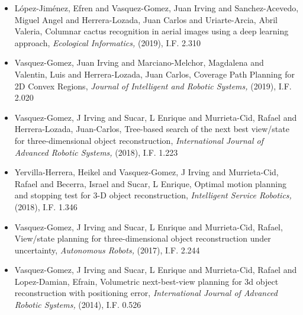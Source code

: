 \begin{itemize} 
\item L{\'o}pez-Jim{\'e}nez, Efren and Vasquez-Gomez, Juan Irving and Sanchez-Acevedo, Miguel Angel and Herrera-Lozada, Juan Carlos and Uriarte-Arcia, Abril Valeria, Columnar cactus recognition in aerial images using a deep learning approach,\textit{ Ecological Informatics,} (2019), I.F. 2.310 
\item Vasquez-Gomez, Juan Irving and Marciano-Melchor, Magdalena and Valentin, Luis and Herrera-Lozada, Juan Carlos, Coverage Path Planning for 2D Convex Regions,\textit{ Journal of Intelligent and Robotic Systems,} (2019), I.F. 2.020 
\item Vasquez-Gomez, J Irving and Sucar, L Enrique and Murrieta-Cid, Rafael and Herrera-Lozada, Juan-Carlos, Tree-based search of the next best view/state for three-dimensional object reconstruction,\textit{ International Journal of Advanced Robotic Systems,} (2018), I.F. 1.223 
\item Yervilla-Herrera, Heikel and Vasquez-Gomez, J Irving and Murrieta-Cid, Rafael and Becerra, Israel and Sucar, L Enrique, Optimal motion planning and stopping test for 3-D object reconstruction,\textit{ Intelligent Service Robotics,} (2018), I.F. 1.346 
\item Vasquez-Gomez, J Irving and Sucar, L Enrique and Murrieta-Cid, Rafael, View/state planning for three-dimensional object reconstruction under uncertainty,\textit{ Autonomous Robots,} (2017), I.F. 2.244 
\item Vasquez-Gomez, J Irving and Sucar, L Enrique and Murrieta-Cid, Rafael and Lopez-Damian, Efrain, Volumetric next-best-view planning for 3d object reconstruction with positioning error,\textit{ International Journal of Advanced Robotic Systems,} (2014), I.F. 0.526 
\end{itemize} 
